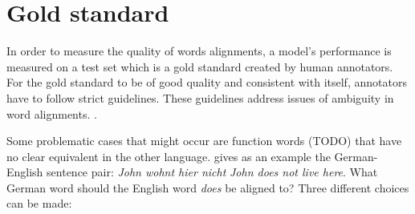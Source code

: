 \chapter{Gold standard}
In order to measure the quality of words alignments, a model's performance is measured on a test set which is a gold standard created by human annotators. 
For the gold standard to be of good quality and consistent with itself, annotators have to follow strict guidelines.
These guidelines address issues of ambiguity in word alignments. \autocite[115]{koehn2009}. 

Some problematic cases that might occur are function words (TODO) that have no clear equivalent in the other language. 
\cite{koehn2009} gives as an example the German-English sentence pair: \emph{John wohnt hier nicht}  \emph{John does not live here}. 
What German word should the English word \emph{does} be aligned to? 
Three different choices can be made:
